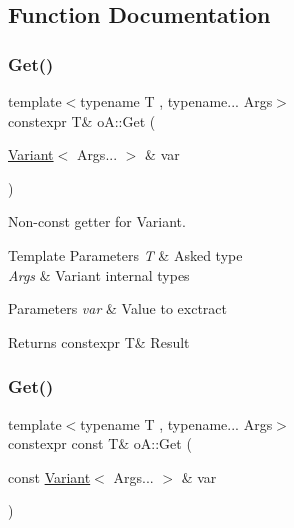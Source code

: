 \subsection{Function Documentation}
\mbox{\label{namespaceo_a_ad005adf81258b6620b273f6b58be4a42}} 
\subsubsection{\texorpdfstring{Get()}{Get()}\hspace{0.1cm}{\footnotesize\ttfamily [1/2]}}
{\footnotesize\ttfamily template$<$typename T , typename... Args$>$ \\
constexpr T\& o\+A\+::\+Get (\begin{DoxyParamCaption}\item[{\mbox{\hyperlink{namespaceo_a_a46a1498e4e673b19327a24fac0018867}{Variant}}$<$ Args... $>$ \&}]{var }\end{DoxyParamCaption})\hspace{0.3cm}{\ttfamily [inline]}}



Non-\/const getter for Variant. 


\begin{DoxyTemplParams}{Template Parameters}
{\em T} & Asked type \\
\hline
{\em Args} & Variant internal types \\
\hline
\end{DoxyTemplParams}

\begin{DoxyParams}{Parameters}
{\em var} & Value to exctract \\
\hline
\end{DoxyParams}
\begin{DoxyReturn}{Returns}
constexpr T\& Result 
\end{DoxyReturn}
\mbox{\label{namespaceo_a_a1d74fafe5226bbc3bc4bcb41f6f24113}} 
\subsubsection{\texorpdfstring{Get()}{Get()}\hspace{0.1cm}{\footnotesize\ttfamily [2/2]}}
{\footnotesize\ttfamily template$<$typename T , typename... Args$>$ \\
constexpr const T\& o\+A\+::\+Get (\begin{DoxyParamCaption}\item[{const \mbox{\hyperlink{namespaceo_a_a46a1498e4e673b19327a24fac0018867}{Variant}}$<$ Args... $>$ \&}]{var }\end{DoxyParamCaption})\hspace{0.3cm}{\ttfamily [inline]}}



